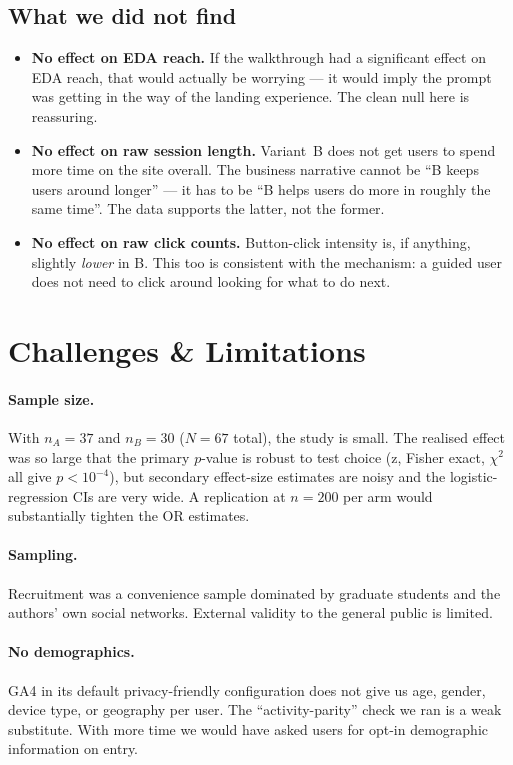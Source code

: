 \documentclass[11pt,a4paper]{article}
\begin{document}
\subsection{What we did not find}
\begin{itemize}[leftmargin=1.4em,itemsep=2pt]
\item \textbf{No effect on EDA reach.} If the walkthrough had a
  significant effect on EDA reach, that would actually be
  worrying — it would imply the prompt was getting in the way of
  the landing experience. The clean null here is reassuring.
\item \textbf{No effect on raw session length.} Variant~B does
  not get users to spend more time on the site overall. The
  business narrative cannot be ``B keeps users around longer''
  — it has to be ``B helps users do more in roughly the same
  time''. The data supports the latter, not the former.
\item \textbf{No effect on raw click counts.} Button-click
  intensity is, if anything, slightly \emph{lower} in B. This
  too is consistent with the mechanism: a guided user does not
  need to click around looking for what to do next.
\end{itemize}

\section{Challenges \& Limitations}
\label{sec:limits}

\paragraph{Sample size.}
With $n_A = 37$ and $n_B = 30$ ($N=67$ total), the study is
small. The realised effect was so large that the primary $p$-value
is robust to test choice (z, Fisher exact, $\chi^2$ all give
$p < 10^{-4}$), but secondary effect-size estimates are noisy and
the logistic-regression CIs are very wide. A replication at $n =
200$ per arm would substantially tighten the OR estimates.

\paragraph{Sampling.}
Recruitment was a convenience sample dominated by graduate
students and the authors' own social networks. External validity
to the general public is limited.

\paragraph{No demographics.}
GA4 in its default privacy-friendly configuration does not give
us age, gender, device type, or geography per user. The
``activity-parity'' check we ran is a weak substitute. With more
time we would have asked users for opt-in demographic information
on entry.
\end{document}
